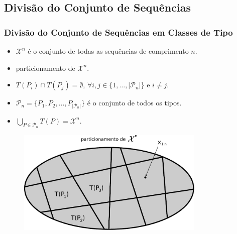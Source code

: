 \subsection{Divisão do Conjunto de Sequências}
\begin{frame}[allowframebreaks]
  \frametitle{Divisão do Conjunto de Sequências em Classes de Tipo}
  \begin{itemize}
  \item $\mathcal{X}^n$ é o conjunto de todas as sequências de comprimento $n$.
  \item particionamento de $\mathcal{X}^n$.
  \item $T(P_i) \cap T(P_j) = \emptyset$, $\forall i,j \in \{1, \ldots, \vert \mathcal{P}_n \vert\}$ e $i \neq j$.
  \item $\mathcal{P}_n = \{ P_1, P_2, \ldots, P_{\vert \mathcal{P}_n \vert} \}$ é o conjunto de todos os tipos.
  \item $\bigcup_{P \in \mathcal{P}_n} T(P) = \mathcal{X}^n$.
  \end{itemize}

  \begin{figure}[h!]
  \centering
  \includegraphics[width=0.8\textwidth]{images/particao-Xn2.pdf}
  \label{fig:particao-Xn}
  \end{figure}
\end{frame}


